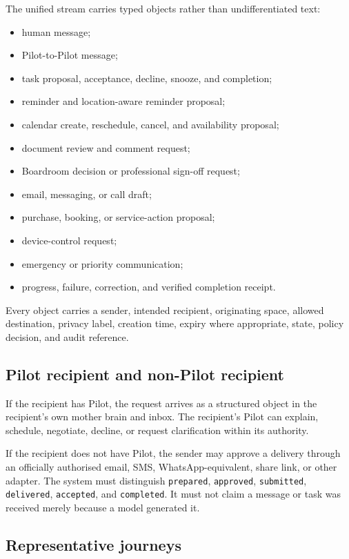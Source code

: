 \documentclass[11pt,a4paper]{article}
\begin{document}
The unified stream carries typed objects rather than undifferentiated text:

\begin{itemize}[leftmargin=*]
  \item human message;
  \item Pilot-to-Pilot message;
  \item task proposal, acceptance, decline, snooze, and completion;
  \item reminder and location-aware reminder proposal;
  \item calendar create, reschedule, cancel, and availability proposal;
  \item document review and comment request;
  \item Boardroom decision or professional sign-off request;
  \item email, messaging, or call draft;
  \item purchase, booking, or service-action proposal;
  \item device-control request;
  \item emergency or priority communication;
  \item progress, failure, correction, and verified completion receipt.
\end{itemize}

Every object carries a sender, intended recipient, originating space, allowed
destination, privacy label, creation time, expiry where appropriate, state,
policy decision, and audit reference.

\subsection{Pilot recipient and non-Pilot recipient}

If the recipient has Pilot, the request arrives as a structured object in the
recipient's own mother brain and inbox.  The recipient's Pilot can explain,
schedule, negotiate, decline, or request clarification within its authority.

If the recipient does not have Pilot, the sender may approve a delivery through
an officially authorised email, SMS, WhatsApp-equivalent, share link, or other
adapter.  The system must distinguish \texttt{prepared}, \texttt{approved},
\texttt{submitted}, \texttt{delivered}, \texttt{accepted}, and
\texttt{completed}.  It must not claim a message or task was received merely
because a model generated it.

\subsection{Representative journeys}
\end{document}
